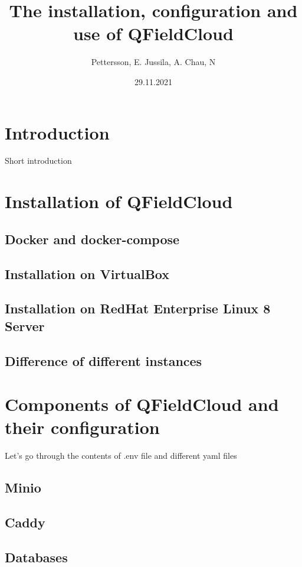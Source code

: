 \documentclass{article}
\title{The installation, configuration and use of QFieldCloud}
\author{Pettersson, E. Jussila, A. Chau, N}
\date{29.11.2021}
\begin{document}
\maketitle

\section{Introduction}
Short introduction

\section{Installation of QFieldCloud}


\subsection{Docker and docker-compose}

\subsection{Installation on VirtualBox}

\subsection{Installation on RedHat Enterprise Linux 8 Server}

\subsection{Difference of different instances}

\section{Components of QFieldCloud and their configuration}
Let's go through the contents of .env file and different yaml files

\subsection{Minio}

\subsection{Caddy}

\subsection{Databases}
\end{document}
